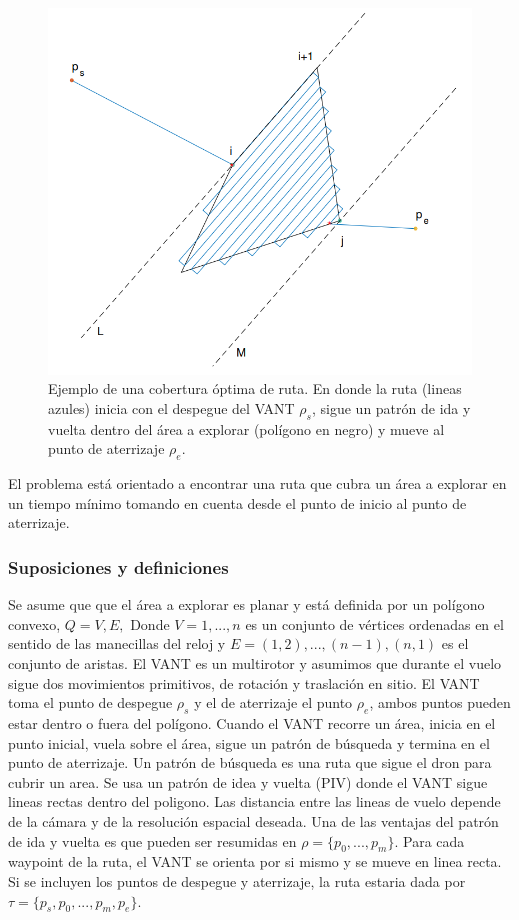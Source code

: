 \documentclass[]{report}
\begin{document}
\begin{figure}[!h]
	\centering
	\includegraphics[width=.4\textwidth]{caliper}
	\caption{Ejemplo de una cobertura óptima de ruta. En donde la ruta (lineas azules) inicia con el despegue del VANT $\rho_s$, sigue un patrón de ida y vuelta dentro del área a explorar (polígono en negro) y mueve al punto de aterrizaje $\rho_e$.}
	\label{fig:caliper}
\end{figure}

El problema está orientado a encontrar una ruta que cubra un área a explorar en un tiempo mínimo tomando en cuenta desde el punto de inicio al punto de aterrizaje.

\subsubsection{Suposiciones y definiciones}
Se asume que que el área a explorar es planar y está definida por un polígono convexo, $Q={V,E},$ Donde $V = {1,...,n}$ es un conjunto de vértices ordenadas en el sentido de las manecillas del reloj y $E = {(1,2),...,(n-1),(n,1)}$ es el conjunto de aristas. El VANT es un multirotor y asumimos que durante el vuelo sigue dos movimientos primitivos, de rotación y traslación en sitio. 
El VANT toma el punto de despegue $\rho_s$ y el de aterrizaje el punto $\rho_e$, ambos puntos pueden estar dentro o fuera del polígono. Cuando el VANT recorre un área, inicia en el punto inicial, vuela sobre el área, sigue un patrón de búsqueda y termina en el punto de aterrizaje.
Un patrón de búsqueda es una ruta que sigue el dron para cubrir un area. Se usa un patrón de idea y vuelta (PIV) donde el VANT sigue lineas rectas dentro del poligono. Las distancia entre las lineas de vuelo depende de la cámara y de la resolución espacial deseada. Una de las ventajas del patrón de ida y vuelta es que pueden ser resumidas en $\rho = \{p_0,...,p_m\}$.
Para cada waypoint de la ruta, el VANT se orienta por si mismo y se mueve en linea recta. Si se incluyen los puntos de despegue y aterrizaje, la ruta estaria dada por $\tau = \{ p_s, p_0,...,p_m, p_e\}$.
\end{document}
